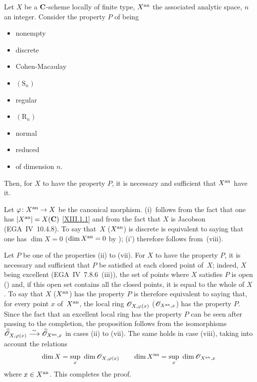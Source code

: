 \begin{proposition}
\label{XII.2.1}
Let $X$ be a $\mathbf{C}$-scheme locally of finite type, $X^{\mathrm{an}}$
the associated analytic space, $n$ an integer. Consider the
property $P$ of being
\begin{itemize}
\item[(i)] nonempty
\item[(i')] discrete
\item[(ii)] Cohen-Macaulay
\item[(iii)] $(\mathrm{S}_n)$
\item[(iv)] regular
\item[(v)] $(\mathrm{R}_n)$
\item[(vi)] normal
\item[(vii)] reduced
\item[(viii)] of dimension $n$.
\end{itemize}
Then, for $X$ to have the property $P$, it is necessary and
sufficient that $X^{\mathrm{an}}$ have it.
\end{proposition}

Let $\varphi\colon X^{\an}\to X$ be the canonical
morphism. (i)~follows from the fact that one has $|X^{\mathrm{an}}|=X(\mathbf{C} )$
\eqref{XIII.1.1} and from the fact that $X$ is Jacobson (EGA~IV~10.4.8). To say that~$X$
(\resp $X^{\mathrm{an}}$) is discrete is equivalent to saying that one has $\dim
X=0$ (\resp $\dim X^{\mathrm{an}}=0$ by \cite[~\S 4~cor]{XII.4}); (i')
therefore follows from~(viii).

Let $P$ be one of the properties (ii) to (vii). For $X$
to have the property $P$, it is necessary and sufficient that $P$
be satisfied at each closed point of~$X$; indeed, $X$
being excellent (EGA~IV~7.8.6~(iii)), the set of points
where $X$ satisfies $P$ is open (\loccit) and, if this open set
contains all the closed points, it is equal to the whole of $X$.
To say that $X$ (\resp $X^{\mathrm{an}}$) has the property $P$
is therefore equivalent to saying that, for every point $x$ of~$X^{\mathrm{an}}$,
the local ring $\cal{O}_{X,\varphi (x)}$ (\resp $\cal{O}_{X^{\an},x}$)
has the property $P$. Since the fact that an excellent local ring
has the property $P$ can be seen after passing to the
completion, the proposition follows from the isomorphisms
$\widehat{\cal{O}}_{X,\varphi(x)}\isomto\widehat{\cal{O}}_{X^{\an},x}$
in cases (ii) to (vii). The same holds in case
(viii), taking into account the relations
$$
\dim X=\sup_x~\dim \cal{O}_{X,\varphi (x)}\qquad \dim
X^{\an}=\sup_x~\dim \cal{O}_{X^{\an},x}
$$
where $x\in X^{\mathrm{an}}$. This completes the proof.

